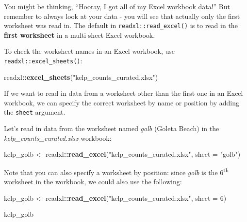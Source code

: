 \documentclass[]{book}
\newenvironment{Shaded}{\begin{snugshade}}{\end{snugshade}}
\newcommand{\DataTypeTok}[1]{\textcolor[rgb]{0.13,0.29,0.53}{#1}}
\newcommand{\DecValTok}[1]{\textcolor[rgb]{0.00,0.00,0.81}{#1}}
\newcommand{\KeywordTok}[1]{\textcolor[rgb]{0.13,0.29,0.53}{\textbf{#1}}}
\newcommand{\NormalTok}[1]{#1}
\newcommand{\OperatorTok}[1]{\textcolor[rgb]{0.81,0.36,0.00}{\textbf{#1}}}
\newcommand{\StringTok}[1]{\textcolor[rgb]{0.31,0.60,0.02}{#1}}
\begin{document}
You might be thinking, ``Hooray, I got all of my Excel workbook data!'' But remember to always look at your data - you will see that actually only the first worksheet was read in. The default in \texttt{readxl::read\_excel()} is to read in the \textbf{first worksheet} in a multi-sheet Excel workbook.

To check the worksheet names in an Excel workbook, use \texttt{readxl::excel\_sheets()}:

\begin{Shaded}
\begin{Highlighting}[]
\NormalTok{readxl}\OperatorTok{::}\KeywordTok{excel_sheets}\NormalTok{(}\StringTok{"kelp_counts_curated.xlsx"}\NormalTok{)}
\end{Highlighting}
\end{Shaded}

If we want to read in data from a worksheet other than the first one in an Excel workbook, we can specify the correct worksheet by name or position by adding the \texttt{sheet} argument.

Let's read in data from the worksheet named \emph{golb} (Goleta Beach) in the \emph{kelp\_counts\_curated.xlsx} workbook:

\begin{Shaded}
\begin{Highlighting}[]
\NormalTok{kelp_golb <-}\StringTok{ }\NormalTok{readxl}\OperatorTok{::}\KeywordTok{read_excel}\NormalTok{(}\StringTok{"kelp_counts_curated.xlsx"}\NormalTok{, }\DataTypeTok{sheet =} \StringTok{"golb"}\NormalTok{)}
\end{Highlighting}
\end{Shaded}

Note that you can also specify a worksheet by position: since \emph{golb} is the 6\textsuperscript{th} worksheet in the workbook, we could also use the following:

\begin{Shaded}
\begin{Highlighting}[]
\NormalTok{kelp_golb <-}\StringTok{ }\NormalTok{readxl}\OperatorTok{::}\KeywordTok{read_excel}\NormalTok{(}\StringTok{"kelp_counts_curated.xlsx"}\NormalTok{, }\DataTypeTok{sheet =} \DecValTok{6}\NormalTok{)}
\end{Highlighting}
\end{Shaded}

\begin{Shaded}
\begin{Highlighting}[]
\NormalTok{kelp_golb}
\end{Highlighting}
\end{Shaded}
\end{document}
